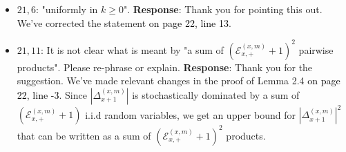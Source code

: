 \documentclass[11pt,a4paper]{article}
\numberwithin{equation}{section}
\newcommand{\abs}[1]{\left\vert #1 \right\vert}
\newcommand{\PL}[2]{\textcolor{black}{on page {#1}, line {#2}}}
\begin{document}
\begin{itemize}
		\item 
		$21,6$: "uniformly in $k\geq 0$".
		\subitem \textbf{Response}:  Thank you for pointing this out.  We've corrected the statement \PL{22}{13}. 
		
		\item 
		$21,11$: It is not clear what is meant by "a sum of $\left(\mathcal{E}^{(x,m)}_{x,+} +1 \right)^2$ pairwise products". Please re-phrase or explain.
		\subitem \textbf{Response}: Thank you for the suggestion. We've made relevant changes in the proof of Lemma 2.4 \PL{22}{-3}. Since $\abs{\Delta_{x+1}^{(x,m)}}$ is stochastically dominated by a sum of $\left(\mathcal{E}^{(x,m)}_{x,+} +1\right)$ i.i.d random variables, we get an upper bound for $\abs{\Delta_{x+1}^{(x,m)}}^2$ that can be written as a sum of  $\left(\mathcal{E}^{(x,m)}_{x,+} +1\right)^2$ products. 
	\end{itemize}
	
	\newpage
\end{document}
